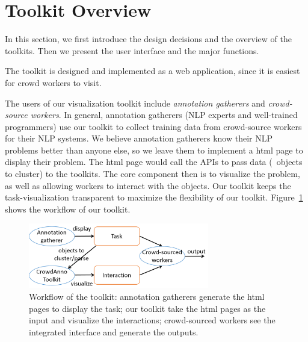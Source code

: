 \section{Toolkit Overview}
In this section, we first introduce the design decisions and the overview of the toolkits. Then we present the user interface and the major functions.

The toolkit is designed and implemented as a web application, since it is easiest for crowd workers to visit.

The users of our visualization toolkit include {\em annotation gatherers} and {\em crowd-source workers}. In general, annotation gatherers (NLP experts and well-trained programmers) use our toolkit to collect training data from crowd-source workers for their NLP systems. We believe annotation gatherers know their NLP problems better than anyone else, so we leave them to implement a html page to display their problem. The html page would call the APIs to pass data (\eg\ objects to cluster) to the toolkits. The core component then is to visualize the problem, as well as allowing workers to interact with the objects. Our toolkit keeps the task-visualization transparent to maximize the flexibility of our toolkit. Figure~\ref{fig:workflow} shows the workflow of our toolkit.

\begin{figure}
\centering
\includegraphics[width=3.1in]{figs/workflow.png}
\caption{Workflow of the toolkit: annotation gatherers generate the html pages to display the task; our toolkit take the html pages as the input and visualize the interactions; crowd-sourced workers see the integrated interface and generate the outputs. }
\label{fig:workflow}
\end{figure}

